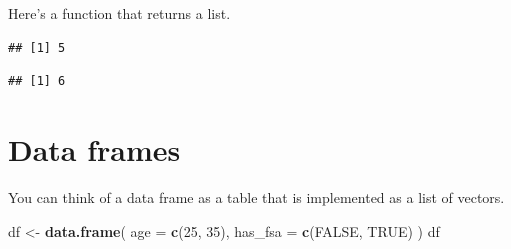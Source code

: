 \documentclass[openany]{book}
\newenvironment{Shaded}{\begin{snugshade}}{\end{snugshade}}
\newcommand{\ControlFlowTok}[1]{\textcolor[rgb]{0.13,0.29,0.53}{\textbf{#1}}}
\newcommand{\DataTypeTok}[1]{\textcolor[rgb]{0.13,0.29,0.53}{#1}}
\newcommand{\DecValTok}[1]{\textcolor[rgb]{0.00,0.00,0.81}{#1}}
\newcommand{\KeywordTok}[1]{\textcolor[rgb]{0.13,0.29,0.53}{\textbf{#1}}}
\newcommand{\NormalTok}[1]{#1}
\newcommand{\OperatorTok}[1]{\textcolor[rgb]{0.81,0.36,0.00}{\textbf{#1}}}
\newcommand{\OtherTok}[1]{\textcolor[rgb]{0.56,0.35,0.01}{#1}}
\newcommand{\StringTok}[1]{\textcolor[rgb]{0.31,0.60,0.02}{#1}}
\begin{document}
Here's a function that returns a list.

\begin{Shaded}
\end{Shaded}

\begin{verbatim}
## [1] 5
\end{verbatim}

\begin{Shaded}
\end{Shaded}

\begin{verbatim}
## [1] 6
\end{verbatim}

\hypertarget{data-frames}{%
\section{Data frames}\label{data-frames}}

You can think of a data frame as a table that is implemented as a list of vectors.

\begin{Shaded}
\begin{Highlighting}[]
\NormalTok{df <-}\StringTok{ }\KeywordTok{data.frame}\NormalTok{(}
  \DataTypeTok{age =} \KeywordTok{c}\NormalTok{(}\DecValTok{25}\NormalTok{, }\DecValTok{35}\NormalTok{),}
  \DataTypeTok{has_fsa =} \KeywordTok{c}\NormalTok{(}\OtherTok{FALSE}\NormalTok{, }\OtherTok{TRUE}\NormalTok{)}
\NormalTok{)}
\NormalTok{df}
\end{Highlighting}
\end{Shaded}
\end{document}
